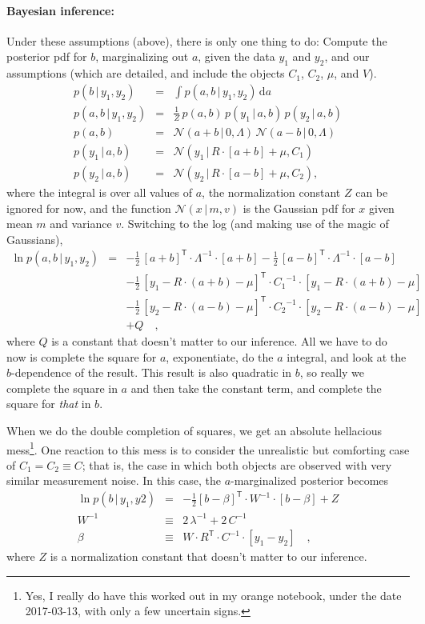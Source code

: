 \documentclass[12pt,letterpaper]{article}
\newcommand{\transpose}[1]{{#1}^{\mathsf{T}}}
\newcommand{\inverse}[1]{{#1}^{-1}}
\newcommand{\given}{\,|\,}
\newcommand{\dd}{\mathrm{d}}
\newcommand{\normal}{\mathcal{N}}
\begin{document}
\paragraph{Bayesian inference:}
Under these assumptions (above), there is only one thing to do:
Compute the posterior pdf for $b$, marginalizing out $a$, given the
data $y_1$ and $y_2$, and our assumptions (which are detailed, and
include the objects $C_1$, $C_2$, $\mu$, and $V$).
\begin{eqnarray}
p(b\given y_1,y_2) &=& \int p(a,b\given y_1,y_2)\,\dd a \\
p(a,b\given y_1,y_2) &=& \frac{1}{Z}\,p(a,b)\,p(y_1\given a,b)\,p(y_2\given a,b) \\
p(a,b) &=& \normal(a+b\given 0,\Lambda)\,\normal(a-b\given 0,\Lambda) \\
p(y_1\given a,b) &=& \normal(y_1\given R\cdot[a+b]+\mu,C_1) \\
p(y_2\given a,b) &=& \normal(y_2\given R\cdot[a-b]+\mu,C_2), \quad
\end{eqnarray}
where the integral is over all values of $a$, the normalization
constant $Z$ can be ignored for now, and the function $\normal(x\given
m,v)$ is the Gaussian pdf for $x$ given mean $m$ and variance
$v$. Switching to the log (and making use of the magic of Gaussians),
\begin{eqnarray}
\ln p(a,b\given y_1,y_2) &=&
  -\frac{1}{2}\,\transpose{[a+b]}\cdot\inverse{\Lambda}\cdot [a+b]
  -\frac{1}{2}\,\transpose{[a-b]}\cdot\inverse{\Lambda}\cdot [a-b] \nonumber\\
  &&
  -\frac{1}{2}\,\transpose{[y_1-R\cdot(a+b)-\mu]}\cdot\inverse{C_1}\cdot [y_1-R\cdot(a+b)-\mu] \nonumber\\
  &&
  -\frac{1}{2}\,\transpose{[y_2-R\cdot(a-b)-\mu]}\cdot\inverse{C_2}\cdot [y_2-R\cdot(a-b)-\mu] \nonumber\\
  &&
  + Q \quad ,
\end{eqnarray}
where $Q$ is a constant that doesn't matter to our inference. All we
have to do now is complete the square for $a$, exponentiate, do the
$a$ integral, and look at the $b$-dependence of the result.
This result is also quadratic in $b$, so really we complete the square
in $a$ and then take the constant term, and complete the square for
\emph{that} in $b$.

When we do the double completion of squares, we get an absolute
hellacious mess\footnote{Yes, I really do have this worked out in my
  orange notebook, under the date 2017-03-13, with only a few
  uncertain signs.}.
One reaction to this mess is to consider the
unrealistic but comforting case of $C_1=C_2\equiv C$; that is, the case in
which both objects are observed with very similar measurement noise.
In this case, the $a$-marginalized posterior becomes
\begin{eqnarray}
\ln p(b\given y_1,y2) &=&
  -\frac{1}{2} \transpose{[b-\beta]}\cdot\inverse{W}\cdot [b-\beta]
  + Z \\
\inverse{W} &\equiv&
  2\,\inverse{\lambda} + 2\,\inverse{C} \\
\beta &\equiv&
  W\cdot\transpose{R}\cdot\inverse{C}\cdot [y_1 - y_2]
\quad ,
\end{eqnarray}
where $Z$ is a normalization constant that doesn't matter to our
inference.
\end{document}

